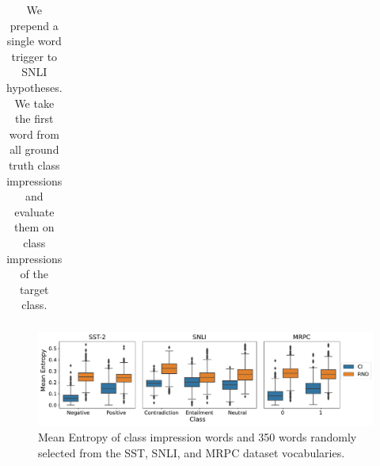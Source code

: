 \begin{table}[!htbp]
{\begin{adjustbox}{max width=\columnwidth}
{\begin{tabular}{|c|c|c|}
\hline

\end{tabular}}
\end{adjustbox}
}
\caption{ We prepend a single word trigger to SNLI hypotheses. We take the first word from all ground truth class impressions and evaluate them on class impressions of the target class.%
\label{table:snli-uat-ci-word-transfer}}
\end{table}

\begin{figure}[!htbp]
 \centering
 \includegraphics[scale=0.4]{images/boxplot_entropy.pdf}

 \caption{
 Mean Entropy of class impression words and 350 words randomly selected from the SST, SNLI, and MRPC dataset vocabularies. \label{fig:entropy-all-3-datasets}}

\end{figure}

